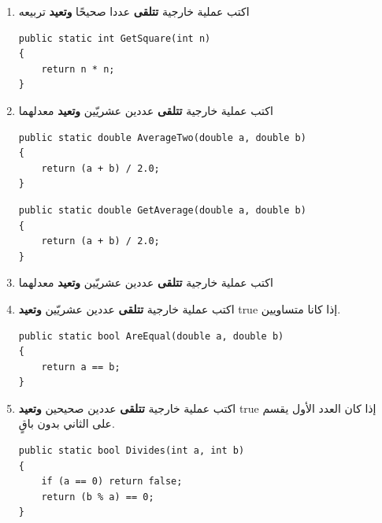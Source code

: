 ﻿\documentclass[12pt]{article}
\begin{document}
\begin{enumerate}[itemsep=3em]
\begin{enumerate}
\item اكتب عملية خارجية \textbf{تتلقى} عددا صحيحًا \textbf{وتعيد} تربيعه
\ifwithsols
\begin{boxSolution}
\begin{english}
\begin{verbatim}
public static int GetSquare(int n)
{
    return n * n;
}
\end{verbatim}
\end{english}
\end{boxSolution}
\fi


\item اكتب عملية خارجية \textbf{تتلقى} عددين عشريّين \textbf{وتعيد} معدلهما
\ifwithsols
\begin{boxSolution}
\begin{english}
\begin{verbatim}
public static double AverageTwo(double a, double b)
{
    return (a + b) / 2.0;
}
\end{verbatim}
\end{english}
\end{boxSolution}
\fi


\ifwithsols
\begin{boxSolution}
\begin{english}
\begin{verbatim}
public static double GetAverage(double a, double b)
{
    return (a + b) / 2.0;
}
\end{verbatim}
\end{english}
\end{boxSolution}
\fi


\item اكتب عملية خارجية \textbf{تتلقى} عددين عشريّين \textbf{وتعيد} معدلهما
\item اكتب عملية خارجية \textbf{تتلقى} عددين عشريّين \textbf{وتعيد} \textenglish{true} إذا كانا متساويين.
\ifwithsols
\begin{boxSolution}
\begin{english}
\begin{verbatim}
public static bool AreEqual(double a, double b)
{
    return a == b;
}
\end{verbatim}
\end{english}
\end{boxSolution}
\fi


\item اكتب عملية خارجية \textbf{تتلقى} عددين صحيحين \textbf{وتعيد} \textenglish{true} إذا كان العدد الأول يقسم على الثاني بدون باقٍ.
\ifwithsols
\begin{boxSolution}
\begin{english}
\begin{verbatim}
public static bool Divides(int a, int b)
{
    if (a == 0) return false;
    return (b % a) == 0;
}
\end{verbatim}
\end{english}
\end{boxSolution}
\fi



\end{enumerate}
\end{enumerate}
\end{document}
